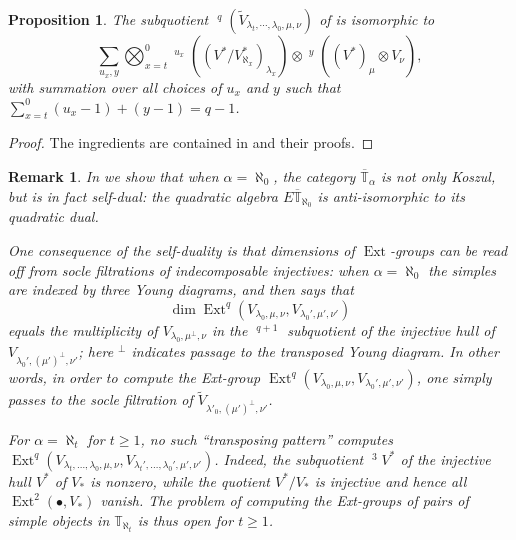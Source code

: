 \documentclass[11pt]{article}
\theoremstyle{plain}
\newtheorem{proposition}[lemma]{Proposition}
\theoremstyle{nonumberplain}
\theoremstyle{plain}
\newtheorem{remark}[lemma]{Remark}
\theoremstyle{nonumberplain}
\newtheorem{proof}{Proof}
\newcommand\bT{\mathbb T}
\newcommand\al{\aleph}
\DeclareMathOperator{\ext}{\mathrm{Ext}}
\DeclareMathOperator{\usoc}{\underline{\mathrm{soc}}}
\begin{document}
\begin{proposition}\label{pr.quot_filt}
The subquotient  $\usoc^q(\widetilde{V}_{\lambda_t,\cdots,\lambda_0,\mu,\nu})$ of   is isomorphic to
\begin{equation*}
  \sum_{u_x,y} \bigotimes_{x=t}^0\usoc^{u_x}((V^*/V^*_{\al_x})_{\lambda_x})\otimes \usoc^y((V^*)_{\mu}\otimes V_{\nu}),
\end{equation*}
with summation over all choices of $u_x$ and $y$ such that 
$
  \sum_{x=t}^0 (u_x-1)+(y-1)=q-1$.
\end{proposition}
\begin{proof}
  The ingredients are contained in 
  and their proofs.
%
%
\end{proof}


\begin{remark}\label{re.non-sd}
  In \cite[$\S$3.7]{us2} we show that when $\alpha=\aleph_0$, the
  category $\overline{\bT}_\alpha$ is not only Koszul, but is in fact
  {\it self-dual}: the quadratic algebra $E\overline{\bT}_{\aleph_0}$
  is anti-isomorphic to its quadratic dual.

  One consequence of the self-duality is that dimensions of $\ext$-groups can be read off from socle filtrations of indecomposable
  injectives: when $\alpha=\aleph_0$ the simples  are
  indexed by three Young diagrams, and \cite[Corollary 3.34]{us2} then
  says that
  \begin{equation*}
    \dim \ext^q(V_{\lambda_0,\mu,\nu},V_{\lambda_0',\mu',\nu'}) 
  \end{equation*}
  equals the multiplicity of $V_{\lambda_0,\mu^{\perp},\nu}$ in the
  $\usoc^{q+1}$ subquotient of the injective hull of
  $V_{\lambda_0',(\mu')^\perp,\nu'}$; here $^\perp$ indicates passage to the transposed Young diagram.
  In other words, in order to compute the Ext-group $ \ext^q(V_{\lambda_0,\mu,\nu},V_{\lambda_0',\mu',\nu'})$, one simply passes to the socle filtration of $\widetilde{V}_{\lambda'_0,(\mu')^\perp,\nu'}$.  
  
  For $\alpha= \aleph_t$ for $t\geq 1$, no such ``transposing pattern'' computes $ \ext^q(V_{\lambda_t,\ldots,\lambda_0,\mu,\nu},V_{\lambda_t',\ldots,\lambda_0',\mu',\nu'})$.  Indeed, the subquotient $\usoc^3 V^*$ of the injective hull $V^*$
  of $V_*$ is nonzero, while the quotient
  $V^*/V_*$ is injective and hence all $\ext^2(\bullet,V_*)$ vanish.  The problem of computing the Ext-groups of pairs of simple objects in $\bT_{\aleph_t}$ is thus open for $t\geq 1$.
\end{remark}
\end{document}
